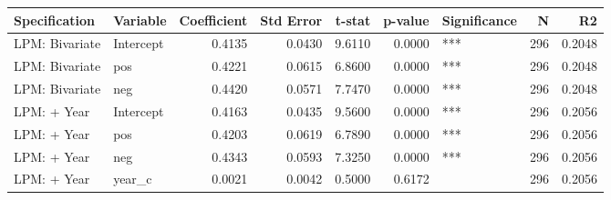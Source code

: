 \begin{tabular}{llrrrrlrr}
\toprule
Specification & Variable & Coefficient & Std Error & t-stat & p-value & Significance & N & R2 \\
\midrule
LPM: Bivariate & Intercept & 0.4135 & 0.0430 & 9.6110 & 0.0000 & *** & 296 & 0.2048 \\
LPM: Bivariate & pos & 0.4221 & 0.0615 & 6.8600 & 0.0000 & *** & 296 & 0.2048 \\
LPM: Bivariate & neg & 0.4420 & 0.0571 & 7.7470 & 0.0000 & *** & 296 & 0.2048 \\
LPM: + Year & Intercept & 0.4163 & 0.0435 & 9.5600 & 0.0000 & *** & 296 & 0.2056 \\
LPM: + Year & pos & 0.4203 & 0.0619 & 6.7890 & 0.0000 & *** & 296 & 0.2056 \\
LPM: + Year & neg & 0.4343 & 0.0593 & 7.3250 & 0.0000 & *** & 296 & 0.2056 \\
LPM: + Year & year_c & 0.0021 & 0.0042 & 0.5000 & 0.6172 &  & 296 & 0.2056 \\
\bottomrule
\end{tabular}
